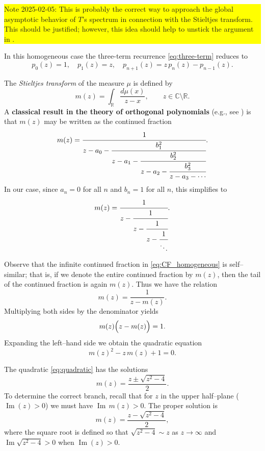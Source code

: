 \documentclass[letterpaper,11pt,oneside,reqno]{article}
\numberwithin{equation}{section}
\theoremstyle{definition}
\begin{document}
\colorbox{yellow}{\parbox{.7\textwidth}{Note 2025-02-05:
This is probably the correct way to approach the global asymptotic behavior of
$T$'s spectrum in connection with the Stieltjes transform.
This should be justified; however, this idea should help to unstick
the argument in .}}

In this homogeneous case the three-term recurrence \eqref{eq:three-term} reduces to
\[
p_0(z)=1,\quad p_1(z)=z,\quad p_{n+1}(z)=z\,p_n(z)-p_{n-1}(z).
\]

\medskip
The \emph{Stieltjes transform} of the measure \(\mu\) is defined by
\[
m(z)=\int_{\mathbb{R}}\frac{d\mu(x)}{z-x},\qquad z\in\mathbb{C}\setminus\mathbb{R}.
\]
A \textbf{classical result in the theory of orthogonal polynomials}
(e.g., see \cite{sokal2020euler})
is that \(m(z)\) may be written as the continued fraction
\begin{equation}\label{eq:CF}
m(z)=\cfrac{1}{z-a_0-\cfrac{b_1^2}{z-a_1-\cfrac{b_2^2}{z-a_2-\cfrac{b_3^2}{z-a_3-\cdots}}}}.
\end{equation}
In our case, since \(a_n=0\) for all \(n\) and \(b_n=1\) for all \(n\), this simplifies to
\begin{equation}\label{eq:CF_homogeneous}
m(z)=\cfrac{1}{z-\cfrac{1}{z-\cfrac{1}{z-\cfrac{1}{\ddots}}}}.
\end{equation}


Observe that the infinite continued fraction in \eqref{eq:CF_homogeneous} is self--similar; that is, if we denote the entire continued fraction by \(m(z)\), then the tail of the continued fraction is again \(m(z)\). Thus we have the relation
\[
m(z)=\frac{1}{z-m(z)}.
\]
Multiplying both sides by the denominator yields
\[
m(z)\Bigl(z-m(z)\Bigr)=1.
\]
Expanding the left--hand side we obtain the quadratic equation
\begin{equation}\label{eq:quadratic}
m(z)^2-z\,m(z)+1=0.
\end{equation}


The quadratic \eqref{eq:quadratic} has the solutions
\[
m(z)=\frac{z\pm\sqrt{z^2-4}}{2}.
\]
To determine the correct branch, recall that for \(z\) in the upper half--plane (\(\operatorname{Im}(z)>0\)) we must have \(\operatorname{Im}\,m(z)>0\). The proper solution is
\begin{equation}\label{eq:m_solution}
m(z)=\frac{z-\sqrt{z^2-4}}{2},
\end{equation}
where the square root is defined so that \(\sqrt{z^2-4}\sim z\) as \(z\to\infty\) and \(\operatorname{Im}\sqrt{z^2-4}>0\) when \(\operatorname{Im}(z)>0\).
\end{document}
